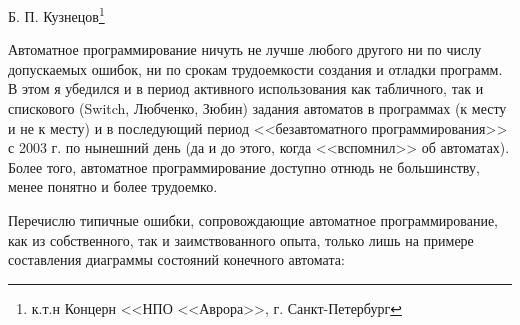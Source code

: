 \documentclass[12pt, twoside]{report}
\begin{document}
Б. П. Кузнецов\footnote{к.т.н Концерн <<НПО <<Аврора>>, г. Санкт-Петербург}

Автоматное программирование ничуть не лучше любого другого ни по числу допускаемых ошибок, 
ни по срокам трудоемкости создания и отладки программ. В этом я убедился и в период активного 
использования как табличного, так и спискового (Switch, Любченко, Зюбин) задания автоматов 
в программах (к месту и не к месту) и в последующий период <<безавтоматного программирования>> 
с 2003 г. по нынешний день (да и до этого, когда <<вспомнил>> об автоматах). Более того, 
автоматное программирование доступно отнюдь не большинству, менее понятно и более трудоемко.

Перечислю типичные ошибки, сопровождающие автоматное программирование, как из собственного, 
так и заимствованного опыта, только лишь на примере составления диаграммы состояний конечного автомата:
\end{document}
